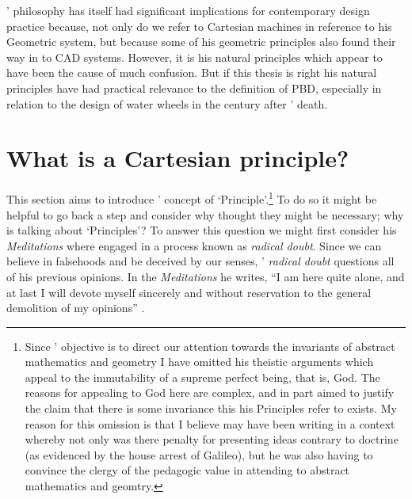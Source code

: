 \documentclass[a4paper, 12pt]{article}
\begin{document}
\citeauthor{descartes_principles_1982}' philosophy has itself had significant implications for contemporary design practice because, not only do we refer to Cartesian machines in reference to his Geometric system, but because some of his geometric principles also found their way in to CAD systems. However, it is his natural principles which appear to have been the cause of much confusion. But if this thesis is right his natural principles have had practical relevance to the definition of PBD, especially in relation to the design of water wheels in the century after \citeauthor{descartes_principles_1982}' death.

\section{What is a Cartesian principle?} 
\label{sec:cartesian:principle}

This section aims to introduce \citeauthor{descartes_principles_1982}' concept of `Principle'.\footnote{Since \citeauthor{descartes_principles_1982}' objective is to direct our attention towards the invariants of abstract mathematics and geometry I have omitted his theistic arguments which appeal to the immutability of a supreme perfect being, that is, God. The reasons for appealing to God here are complex, and in part aimed to justify the claim that there is some invariance this his Principles refer to exists. My reason for this omission is that I believe \citeauthor{descartes_principles_1982} may have been writing in a context whereby not only was there penalty for presenting ideas contrary to doctrine (as evidenced by the house arrest of Galileo), but he was also having to convince the clergy of the pedagogic value in attending to abstract mathematics and geomtry.} To do so it might be helpful to go back a step and consider why \citeauthor{descartes_principles_1982} thought they might be necessary; why is \citeauthor{descartes_principles_1982} talking about `Principles'? To answer this question we might first consider his \textit{Meditations} where \citeauthor{descartes_meditations_2013} engaged in a process known as \textit{radical doubt}. Since we can believe in falsehoods and be deceived by our senses, \citeauthor{descartes_meditations_2013}' \textit{radical doubt} questions all of his previous opinions. In the \textit{Meditations} he writes, ``I am here quite alone, and at last I will devote myself sincerely and without reservation to the general demolition of my opinions'' \citep[\S~18, p.~12]{descartes_meditations_2013}.
\end{document}
